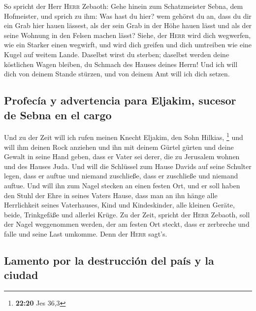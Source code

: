  So spricht der Herr \textsc{Herr} Zebaoth: Gehe hinein
zum Schatzmeister Sebna, dem Hofmeister, und sprich zu ihm:
 Was hast du hier? wem gehörst du an, dass du dir ein
Grab hier hauen lässest, als der sein Grab in der Höhe hauen lässt und
als der seine Wohnung in den Felsen machen lässt?  Siehe,
der \textsc{Herr} wird dich wegwerfen, wie ein Starker einen wegwirft,
und wird dich greifen  und dich umtreiben wie eine Kugel
auf weitem Lande. Daselbst wirst du sterben; daselbst werden deine
köstlichen Wagen bleiben, du Schmach des Hauses deines Herrn!
 Und ich will dich von deinem Stande stürzen, und von
deinem Amt will ich dich setzen.

\hypertarget{profecuxeda-y-advertencia-para-eljakim-sucesor-de-sebna-en-el-cargo}{%
\subsection{Profecía y advertencia para Eljakim, sucesor de Sebna en el
cargo}\label{profecuxeda-y-advertencia-para-eljakim-sucesor-de-sebna-en-el-cargo}}

 Und zu der Zeit will ich rufen meinen Knecht Eljakim,
den Sohn Hilkias, \footnote{\textbf{22:20} Jes 36,3}  und
will ihm deinen Rock anziehen und ihn mit deinem Gürtel gürten und deine
Gewalt in seine Hand geben, dass er Vater sei derer, die zu Jerusalem
wohnen und des Hauses Juda.  Und will die Schlüssel zum
Hause Davids auf seine Schulter legen, dass er auftue und niemand
zuschließe, dass er zuschließe und niemand auftue.  Und
will ihn zum Nagel stecken an einen festen Ort, und er soll haben den
Stuhl der Ehre in seines Vaters Hause,  dass man an ihn
hänge alle Herrlichkeit seines Vaterhauses, Kind und Kindeskinder, alle
kleinen Geräte, beide, Trinkgefäße und allerlei Krüge. 
Zu der Zeit, spricht der \textsc{Herr} Zebaoth, soll der Nagel
weggenommen werden, der am festen Ort steckt, dass er zerbreche und
falle und seine Last umkomme. Denn der \textsc{Herr} sagt's.

\hypertarget{lamento-por-la-destrucciuxf3n-del-pauxeds-y-la-ciudad}{%
\subsection{Lamento por la destrucción del país y la
ciudad}\label{lamento-por-la-destrucciuxf3n-del-pauxeds-y-la-ciudad}}

